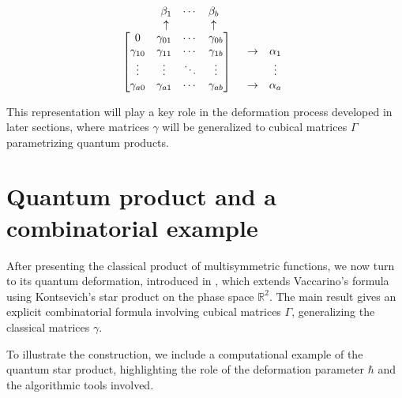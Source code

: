 \documentclass[11pt]{article}
\begin{document}
\[
\begin{array}{cc}
	\begin{array}{ c c c c}
		\phantom{abc} & \beta_1 & \cdots & \beta_b \\
		\mbox{} & \uparrow & \mbox{}  & \uparrow\\
	\end{array} &  
	\begin{array}{cc}
		\mbox{}  & \mbox{} \\
		\mbox{}  & \mbox{} \\
	\end{array}\\
	\begin{bmatrix}
		0          &\gamma_{01}&\cdots&\gamma_{0b}\\
		\gamma_{10}&\gamma_{11}&\cdots&\gamma_{1b}\\
		\vdots & \vdots & \ddots & \vdots\\
		\gamma_{a0}&\gamma_{a1}&\cdots&\gamma_{ab}
	\end{bmatrix} & 
	\begin{array}{cc}
		\mbox{} & \mbox{}\\
		\to & \alpha_1\\
		\mbox{}  & \vdots\\
		\to & \alpha_a
	\end{array}
\end{array}
\]

This representation will play a key role in the deformation process developed in later sections, where matrices $\gamma$ will be generalized to cubical matrices $\Gamma$ parametrizing quantum products.



\section{Quantum product and a combinatorial example}

After presenting the classical product of multisymmetric functions, we now turn to its quantum deformation, introduced in \cite{DP2}, which extends Vaccarino’s formula using Kontsevich’s star product on the phase space $\mathbb{R}^2$. The main result gives an explicit combinatorial formula involving cubical matrices $\Gamma$, generalizing the classical matrices $\gamma$. 

To illustrate the construction, we include a computational example of the quantum star product, highlighting the role of the deformation parameter $\hbar$ and the algorithmic tools involved.
\end{document}
